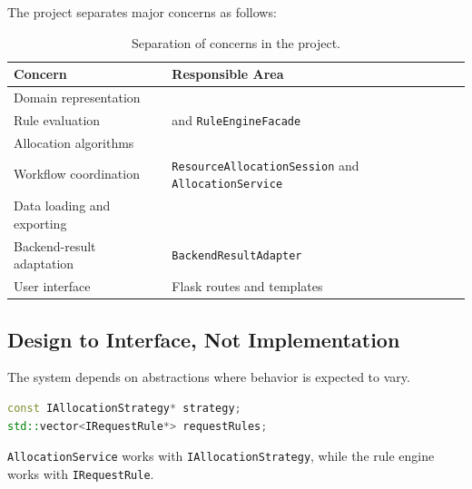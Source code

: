 \documentclass[12pt,a4paper]{article}
\begin{document}
The project separates major concerns as follows:

\begin{table}[H]
    \centering
    \small
    \caption{Separation of concerns in the project.}
    \begin{tabularx}{\textwidth}{L{4.1cm}Y}
        \toprule
        \textbf{Concern} & \textbf{Responsible Area} \\
        \midrule

        Domain representation
        &  \\

        Rule evaluation
        &  and \texttt{RuleEngineFacade} \\

        Allocation algorithms
        &  \\

        Workflow coordination
        & \texttt{ResourceAllocationSession} and
        \texttt{AllocationService} \\

        Data loading and exporting
        &  \\

        Backend-result adaptation
        & \texttt{BackendResultAdapter} \\

        User interface
        & Flask routes and templates \\

        \bottomrule
    \end{tabularx}
\end{table}

\subsection{Design to Interface, Not Implementation}

The system depends on abstractions where behavior is expected to vary.

\begin{lstlisting}[language=C++]
const IAllocationStrategy* strategy;
std::vector<IRequestRule*> requestRules;
\end{lstlisting}

\texttt{AllocationService} works with \texttt{IAllocationStrategy}, while the
rule engine works with \texttt{IRequestRule}.
\end{document}
